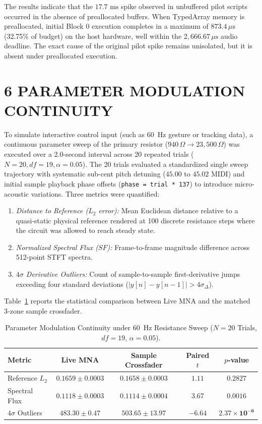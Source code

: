 \documentclass[fleqn,draft]{jaes}
\begin{document}
The results indicate that the $17.7\text{ ms}$ spike observed in unbuffered pilot scripts occurred in the absence of preallocated buffers. When TypedArray memory is preallocated, initial Block 0 execution completes in a maximum of $873.4\,\mu\text{s}$ (32.75\% of budget) on the host hardware, well within the $2,666.67\,\mu\text{s}$ audio deadline. The exact cause of the original pilot spike remains unisolated, but it is absent under preallocated execution.

\section{6 PARAMETER MODULATION CONTINUITY}

To simulate interactive control input (such as 60~Hz gesture or tracking data), a continuous parameter sweep of the primary resistor ($940\,\Omega \to 23,500\,\Omega$) was executed over a 2.0-second interval across 20 repeated trials ($N = 20, df = 19, \alpha = 0.05$). The 20 trials evaluated a standardized single sweep trajectory with systematic sub-cent pitch detuning ($45.00$ to $45.02$ MIDI) and initial sample playback phase offsets (\texttt{phase = trial * 137}) to introduce micro-acoustic variations. Three metrics were quantified:
\begin{enumerate}
\item \textit{Distance to Reference ($L_2$ error):} Mean Euclidean distance relative to a quasi-static physical reference rendered at 100 discrete resistance steps where the circuit was allowed to reach steady state.
\item \textit{Normalized Spectral Flux ($SF$):} Frame-to-frame magnitude difference across 512-point STFT spectra.
\item \textit{$4\sigma$ Derivative Outliers:} Count of sample-to-sample first-derivative jumps exceeding four standard deviations ($|y[n] - y[n-1]| > 4\sigma_{\Delta}$).
\end{enumerate}

Table~\ref{tab:continuity} reports the statistical comparison between Live MNA and the matched 3-zone sample crossfader.

\begin{table}[h]
\caption{Parameter Modulation Continuity under 60~Hz Resistance Sweep ($N=20$ Trials, $df=19$, $\alpha = 0.05$).}
\label{tab:continuity}
\centering
\begin{tabular}{lcccc}
\toprule
Metric & Live MNA & Sample Crossfader & Paired $t$ & $p$-value \\
\midrule
Reference $L_2$ & $0.1659 \pm 0.0003$ & $0.1658 \pm 0.0003$ & $1.11$ & $0.2827$ \\
Spectral Flux & $0.1118 \pm 0.0003$ & $0.1114 \pm 0.0004$ & $3.67$ & $0.0016$ \\
$4\sigma$ Outliers & $\mathbf{483.30 \pm 0.47}$ & $503.65 \pm 13.97$ & $\mathbf{-6.64}$ & $\mathbf{2.37 \times 10^{-6}}$ \\
\bottomrule
\end{tabular}
\end{table}
\end{document}
